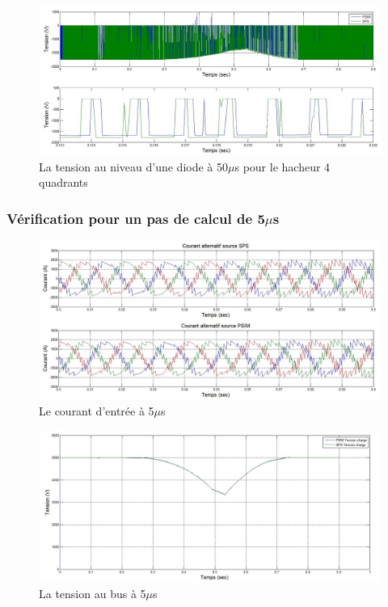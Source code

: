 \documentclass[11pt,letterpaper,final]{report}
\begin{document}
\begin{figure}[htb]
\centering
\includegraphics[scale=0.5]{Fig/DCP_AFE/50u/hash_diode.jpg}
\caption{La tension au niveau d'une diode à 50$\mu$s pour le hacheur 4 quadrants}
\label{AF_DC_HV50}
\end{figure}

\clearpage
\subsubsection{Vérification pour un pas de calcul de 5$\mu$s}

\begin{figure}[htb]
\centering
\includegraphics[scale=0.5]{Fig/DCP_AFE/5u/cour_al.jpg}
\caption{Le courant d'entrée à 5$\mu$s}
\label{AF_DC_cou5}
\end{figure}

\begin{figure}[htb]
\centering
\includegraphics[scale=0.5]{Fig/DCP_AFE/5u/ten_bus.jpg}
\caption{La tension au bus à 5$\mu$s}
\label{AF_DC_vch5}
\end{figure}
\end{document}
